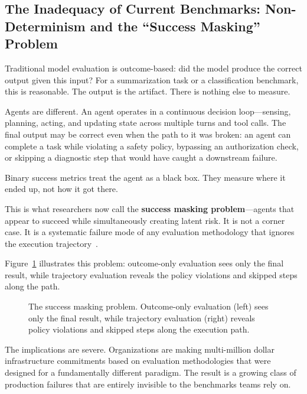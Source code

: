 \documentclass[11pt]{article}
\newcommand{\keyword}[1]{\textbf{#1}}
\begin{document}
\subsection{The Inadequacy of Current Benchmarks: Non-Determinism and the ``Success Masking'' Problem}

Traditional model evaluation is outcome-based: did the model produce the correct output given this input? For a summarization task or a classification benchmark, this is reasonable. The output is the artifact. There is nothing else to measure.

Agents are different. An agent operates in a continuous decision loop---sensing, planning, acting, and updating state across multiple turns and tool calls. The final output may be correct even when the path to it was broken: an agent can complete a task while violating a safety policy, bypassing an authorization check, or skipping a diagnostic step that would have caught a downstream failure.

Binary success metrics treat the agent as a black box. They measure where it ended up, not how it got there.

This is what researchers now call the \keyword{success masking problem}---agents that appear to succeed while simultaneously creating latent risk. It is not a corner case. It is a systematic failure mode of any evaluation methodology that ignores the execution trajectory~\citep{beyond_benchmark_islands}.

Figure~\ref{fig:success_masking} illustrates this problem: outcome-only evaluation sees only the final result, while trajectory evaluation reveals the policy violations and skipped steps along the path.

\begin{figure}[htbp]
\centering

\caption{The success masking problem. Outcome-only evaluation (left) sees only the final result, while trajectory evaluation (right) reveals policy violations and skipped steps along the execution path.}
\label{fig:success_masking}
\end{figure}

The implications are severe. Organizations are making multi-million dollar infrastructure commitments based on evaluation methodologies that were designed for a fundamentally different paradigm. The result is a growing class of production failures that are entirely invisible to the benchmarks teams rely on.


\end{document}
